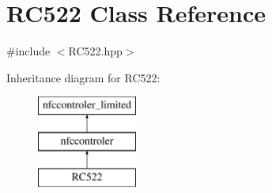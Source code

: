 \hypertarget{class_r_c522}{}\section{R\+C522 Class Reference}
\label{class_r_c522}


{\ttfamily \#include $<$R\+C522.\+hpp$>$}

Inheritance diagram for R\+C522\+:\begin{figure}[H]
\begin{center}
\leavevmode
\includegraphics[height=3.000000cm]{class_r_c522}
\end{center}
\end{figure}
